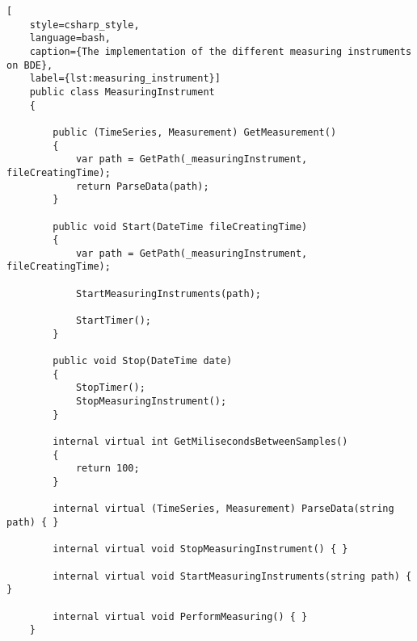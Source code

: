 
\begin{lstlisting}[
    style=csharp_style,
    language=bash, 
    caption={The implementation of the different measuring instruments on BDE},
    label={lst:measuring_instrument}]
    public class MeasuringInstrument
    {
        
        public (TimeSeries, Measurement) GetMeasurement()
        {
            var path = GetPath(_measuringInstrument, fileCreatingTime);
            return ParseData(path);
        }

        public void Start(DateTime fileCreatingTime)
        {
            var path = GetPath(_measuringInstrument, fileCreatingTime);

            StartMeasuringInstruments(path);

            StartTimer();
        }
            
        public void Stop(DateTime date)
        {
            StopTimer();
            StopMeasuringInstrument();
        }

        internal virtual int GetMilisecondsBetweenSamples()
        {
            return 100;
        }
        
        internal virtual (TimeSeries, Measurement) ParseData(string path) { }

        internal virtual void StopMeasuringInstrument() { }

        internal virtual void StartMeasuringInstruments(string path) { }

        internal virtual void PerformMeasuring() { }
    }
\end{lstlisting}